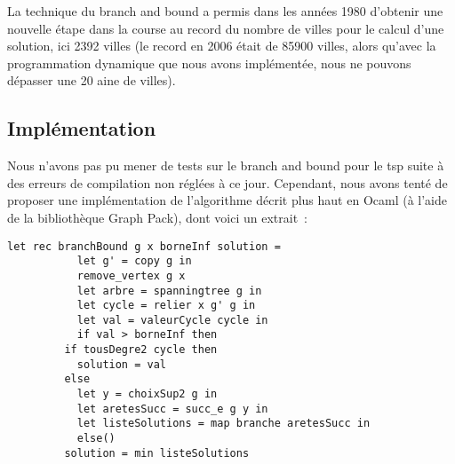 La technique du branch and bound a permis dans les années 1980
d'obtenir une nouvelle étape dans la course au record du nombre de
villes pour le calcul d'une solution, ici 2392 villes (le record en
2006 était de 85900 villes, alors qu'avec la programmation dynamique
que nous avons implémentée, nous ne pouvons dépasser une 20 aine de
villes).

\subsection{Implémentation}

Nous n'avons pas pu mener de tests sur le branch and bound pour le tsp
suite à des erreurs de compilation non réglées à ce jour. Cependant,
nous avons tenté de proposer une implémentation de l'algorithme décrit plus haut
en Ocaml (à l'aide de la bibliothèque Graph Pack), dont voici un extrait~:
\begin{lstlisting}
let rec branchBound g x borneInf solution = 
	       let g' = copy g in
	       remove_vertex g x
	       let arbre = spanningtree g in
	       let cycle = relier x g' g in 
	       let val = valeurCycle cycle in
	       if val > borneInf then 
		 if tousDegre2 cycle then
		   solution = val
		 else
		   let y = choixSup2 g in
		   let aretesSucc = succ_e g y in 
		   let listeSolutions = map branche aretesSucc in
	       else()
		 solution = min listeSolutions
\end{lstlisting}

